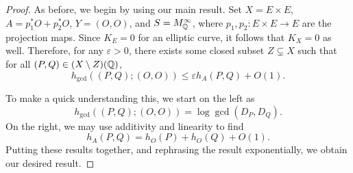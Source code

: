 \begin{proof}
    As before, we begin by using our main result.
    Set $X = E \times E$, $A = p_1^* O + p_2^*O$, $Y = (O, O)$, and $S = M_{\mathbb{Q}}^\infty$,
    where $p_1, p_2 : E \times E \to E$ are the projection maps.
    Since $K_E = 0$ for an elliptic curve,
    it follows that $K_X = 0$ as well.
    Therefore, for any $\varepsilon > 0$,
    there exists some closed subset $Z \subsetneq X$ such that for all $(P,Q) \in (X \setminus Z)(\mathbb{Q})$,
    \[
        h_{\gcd}((P, Q); (O, O))
        \leq \varepsilon h_{A}(P, Q) + O(1).
    \]

    To make a quick understanding this, we start on the left as
    \[
        h_{\gcd}((P, Q); (O, O)) = \log \gcd(D_P, D_Q).
    \]
    On the right, we may use additivity and linearity to find
    \[
        h_{A}(P, Q)
        = h_{O}(P) + h_{O}(Q) + O(1).
    \]
    Putting these results together, and rephrasing the result exponentially, 
    we obtain our desired result.
\end{proof}